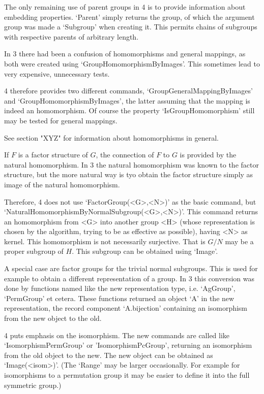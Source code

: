 The only remaining use of parent groups in {\GAP}4 is to provide information
about embedding properties. `Parent' simply returns the group, of which the
argument group was made a `Subgroup' when creating it.
This permits chains of subgroups with respective parents of arbitrary length.


In {\GAP}3 there had been a confusion of homomorphisms and general mappings,
as both were created using `GroupHomomorphismByImages'. This sometimes lead
to very expensive, unnecessary tests.

{\GAP}4 therefore provides two different commands,
`GroupGeneralMappingByImages' and `GroupHomomorphismByImages', the latter
assuming that the mapping is indeed an homomorphism. Of course the property
`IsGroupHomomorphism' still may be tested for general mappings.

See section "XYZ" for information about homomorphisms in general.

If $F$ is a factor structure of $G$, the connection of $F$ to $G$ is
provided by the natural homomorphism. In {\GAP}3 the natural homomorphism
was known to the factor structure, but the more natural way is tyo obtain
the factor structure simply as image of the natural homomorphism.

Therefore, {\GAP}4 does not use `FactorGroup(<G>,<N>)' as the basic command,
but `NaturalHomomorphismByNormalSubgroup(<G>,<N>)'. This command returns an
homomorphism from <G> into another group <H> (whose representation is
chosen by the algorithm, trying to be as effective as possible), having
<N> as kernel. This homomorphism is not necessarily surjective. That is
$G/N$ may be a proper subgroup of $H$. This subgroup can be obtained using
`Image'.

A special case are factor groups for the trivial normal subgroups. This is
used for example to obtain a different representation of a group.
In {\GAP}3 this conversion was done by functions named like the new
representation type, i.e. `AgGroup', `PermGroup' et cetera. These functions
returned an object `A' in the new representation, the record component
`A.bijection' containing an isomorphism from the new object to the old.

{\GAP}4 puts emphasis on the isomorphism. The new commands are called
like `IsomorphismPermGroup' or 'IsomorphismPcGroup', returning an
isomorphism from the old object to the new.
The new object can be obtained as `Image(<isom>)'. (The `Range' may
be larger occasionally. For example for isomorphisms to a permutation group
it may be easier to define it into the full symmetric group.)

